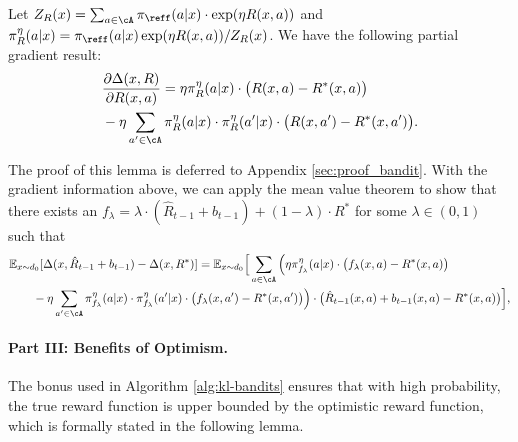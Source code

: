 \documentclass[11pt]{article}
\newcommand{\rE}{\mathbb E}
\begin{document}
\begin{lemma} \label{lem:computation1:copy}
Let $Z_R(x) = \sum_{a \in \cA} \pi_{\reff}(a|x) \cdot \exp(\eta R(x, a))$ and $\pi_R^{\eta}(a|x)=\pi_{\reff}(a|x)\exp(\eta R(x,a))/Z_R(x)$. We have the following partial gradient result:
\begin{equation}
    \label{eqn:computation:sketch}
    \begin{aligned}
        &\frac{\partial\Delta(x,R)}{\partial R(x,a)} = \eta \pi_R^\eta(a|x) \cdot \big(R(x,a) - R^*(x,a)\big)  \\&- \eta \sum_{a' \in \cA} \pi_R^\eta(a|x) \cdot \pi_R^\eta(a'|x) \cdot \big(R(x,a') - R^*(x,a')\big). 
 \end{aligned}
\end{equation}
\end{lemma}
The proof of this lemma is deferred to Appendix \ref{sec:proof_bandit}. With the gradient information above, we can apply the mean value theorem to show that
there exists an $f_\lambda = \lambda \cdot (\hat R_{t - 1} + b_{t - 1}) + (1 - \lambda) \cdot R^*$ for some $\lambda \in (0, 1)$ such that 
\begin{equation}
\begin{aligned} 
    &\rE_{x \sim d_0}[\Delta(x, \hat R_{t - 1} + b_{t - 1}) - \Delta(x, R^*)]  
    = \rE_{x \sim d_0}\Big[\sum_{a\in\cA}\Big(\eta \pi_{f_\lambda}^\eta(a|x) \cdot \big(f_\lambda(x,a) - R^*(x,a)\big) \notag\\&\qquad  - \eta \sum_{a' \in \cA} \pi_{f_\lambda}^\eta(a|x) \cdot \pi_{f_\lambda}^\eta(a'|x) \cdot \big(f_\lambda(x,a') - R^*(x,a')\big)\Big) \cdot\big(\hat R_{t - 1}(x, a) + b_{t - 1}(x, a)-R^*(x,a)\big)\Big], \label{eq:mean-value:sketch_0}
\end{aligned}
\end{equation}

\paragraph{Part III: Benefits of Optimism.}
The bonus used in Algorithm \ref{alg:kl-bandits} ensures that with high probability, the true reward function is upper bounded by the optimistic reward function, which is formally stated in the following lemma.
\end{document}
